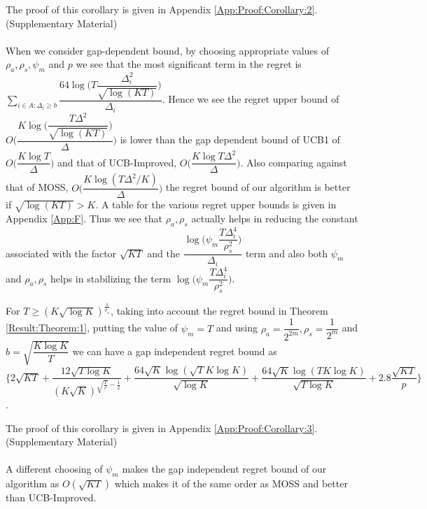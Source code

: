 	The proof of this corollary is given in Appendix \ref{App:Proof:Corollary:2}.(Supplementary Material)

\paragraph*{}When we consider gap-dependent bound, by choosing appropriate values of $\rho_{a},\rho_{s},\psi_{m}$ and $p$ we see that the most significant term in the regret is $\sum_{i\in A:\Delta_{i}\geq b}\dfrac{64\log{\big(T\dfrac{\Delta_{i}^{2}}{\sqrt{\log (KT)}}\big)}}{\Delta_{i}}$. Hence we see the regret upper bound of $O\bigg(\dfrac{K\log \big(\dfrac{T\Delta^{2}}{\sqrt{\log (KT)}}\big)}{\Delta}\bigg)$ is lower than the gap dependent bound of UCB1 of $O\bigg(\dfrac{K\log T}{\Delta}\bigg)$ and that of UCB-Improved, $O\bigg(\dfrac{K\log T\Delta^{2}}{\Delta}\bigg)$. Also comparing against that of MOSS, $O\bigg(\dfrac{K\log(T\Delta^{2}/K)}{\Delta}\bigg)$ the regret bound of our algorithm is better if $\sqrt{\log(KT)}>K$. A table for the various regret upper bounds is given in Appendix \ref{App:F}. Thus we see that $\rho_{a},\rho_{s}$ actually helps in reducing the constant associated with the factor $\sqrt{KT}$ and the $\dfrac{\log\bigg(\psi_{m}\dfrac{T\Delta_{i}^{4}}{\rho_{s}^{2}}\bigg)}{\Delta_{i}}$ term and also both $\psi_{m}$ and $\rho_{a},\rho_{s}$ helps in stabilizing the term $\log\bigg(\psi_{m}\dfrac{T\Delta_{i}^{4}}{\rho_{s}^{2}}\bigg)$.


\begin{corollary}
\label{Result:Corollary:3}
For $T\geq (K\sqrt{\log K})^{\frac{1}{\rho_{a}}}$, taking into account the regret bound in Theorem \ref{Result:Theorem:1}, putting the value of $\psi_{m}=T$ and using $\rho_{a}=\dfrac{1}{2^{2m}},\rho_{s}=\dfrac{1}{2^{m}} $ and $b=\sqrt{\dfrac{K\log K}{T}}$ we can have a gap independent regret bound as $\bigg\lbrace 2\sqrt{KT} + \dfrac{12\sqrt{T\log K}}{(K\sqrt{K})^{\sqrt{\frac{T}{e}}-\frac{1}{2}}} + \dfrac{64\sqrt{K}\log{(\sqrt{T}K\log K)}}{\sqrt{\log K}} + \dfrac{64\sqrt{K}\log{(TK\log K)}}{\sqrt{T\log K}} + 2.8\dfrac{\sqrt{KT}}{p} \bigg\rbrace$.
\end{corollary}

	The proof of this corollary is given in Appendix \ref{App:Proof:Corollary:3}.(Supplementary Material)

\paragraph*{}A different choosing of $\psi_{m}$ makes the gap independent regret bound of our algorithm as $O(\sqrt{KT})$ which makes it of the same order as MOSS and better than UCB-Improved.



